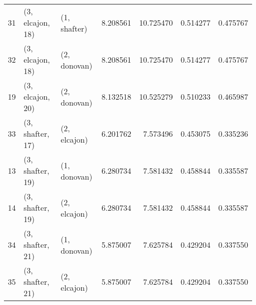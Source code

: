 \begin{tabular}{lllrrrr}
31 &  (3, elcajon, 18) &     (1, shafter) &  8.208561 &  10.725470 &   0.514277 &  0.475767 \\
32 &  (3, elcajon, 18) &     (2, donovan) &  8.208561 &  10.725470 &   0.514277 &  0.475767 \\
19 &  (3, elcajon, 20) &     (2, donovan) &  8.132518 &  10.525279 &   0.510233 &  0.465987 \\
33 &  (3, shafter, 17) &     (2, elcajon) &  6.201762 &   7.573496 &   0.453075 &  0.335236 \\
13 &  (3, shafter, 19) &     (1, donovan) &  6.280734 &   7.581432 &   0.458844 &  0.335587 \\
14 &  (3, shafter, 19) &     (2, elcajon) &  6.280734 &   7.581432 &   0.458844 &  0.335587 \\
34 &  (3, shafter, 21) &     (1, donovan) &  5.875007 &   7.625784 &   0.429204 &  0.337550 \\
35 &  (3, shafter, 21) &     (2, elcajon) &  5.875007 &   7.625784 &   0.429204 &  0.337550 \\
\bottomrule
\end{tabular}
